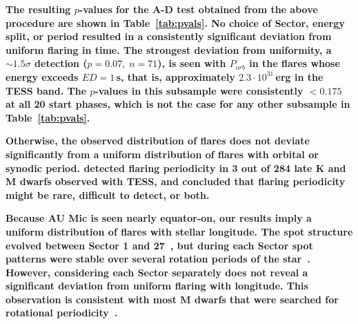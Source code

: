 \documentclass[fleqn,usenatbib]{mnras}%
\begin{document}
\textbf{The resulting $p$-values for the A-D test obtained from the above procedure are shown in Table~\ref{tab:pvals}. No choice of Sector, energy split, or period resulted in a consistently significant deviation from uniform flaring in time. The strongest deviation from uniformity, a $\sim1.5\sigma$ detection ($p=0.07,\;n=71$), is seen with $P_{orb}$ in the flares whose energy exceeds $ED=1$\,s, that is, approximately $2.3\cdot10^{31}\,$erg in the TESS band. The $p$-values in this subsample were consistently $<0.175$ at all 20 start phases, which is not the case for any other subsample in Table~\ref{tab:pvals}.}

\textbf{Otherwise, the observed distribution of flares does not deviate significantly from a uniform distribution of flares with orbital or synodic period. \citet{howard2021evryflare} detected flaring periodicity in 3 out of 284 late K and M dwarfs observed with TESS, and concluded that flaring periodicity might be rare, difficult to detect, or both.}

\textbf{Because AU Mic is seen nearly equator-on, our results imply a uniform distribution of flares with stellar longitude. The spot structure evolved between Sector 1 and 27~\citep{martioli2021new}, but during each Sector spot patterns were stable over several rotation periods of the star~\citep{szabo2021changing}. However, considering each Sector separately does not reveal a significant deviation from uniform flaring with longitude. This observation is consistent with most M dwarfs that were searched for rotational periodicity~\citep{doyle2018, doyle2019}.} 

 

\end{document}

